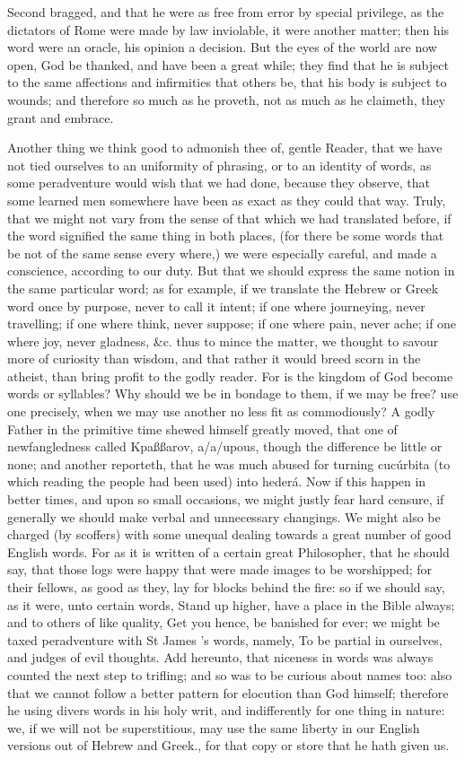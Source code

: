 Second bragged, and that he were as free from error by special privilege, as the dictators of Rome were made by law inviolable, it were another matter; then his word were an oracle, his opinion a decision. But the eyes of the world are now open, God be thanked, and have been a great while; they find that he is subject to the same affections and infirmities that others be, that his body is subject to wounds; and therefore so much as he proveth, not as much as he claimeth, they grant and embrace.

Another thing we think good to admonish thee of, gentle Reader, that we have not tied ourselves to an uniformity of phrasing, or to an identity of words, as some peradventure would wish that we had done, because they observe, that some learned men somewhere have been as exact as they could that way. Truly, that we might not vary from the sense of that which we had translated before, if the word signified the same thing in both places, (for there be some words that be not of the same sense every where,) we were especially careful, and made a conscience, according to our duty. But that we should express the same notion in the same particular word; as for example, if we translate the Hebrew or Greek word once by purpose, never to call it intent; if one where journeying, never travelling; if one where think, never suppose; if one where pain, never ache; if one where joy, never gladness, &c. thus to mince the matter, we thought to savour more of curiosity than wisdom, and that rather it would breed scorn in the atheist, than bring profit to the godly reader. For is the kingdom of God become words or syllables? Why should we be in bondage to them, if we may be free? use one precisely, when we may use another no less fit as commodiously? A godly Father in the primitive time shewed himself greatly moved, that one of newfangledness called Kpaßßarov, a/a/upous, though the difference be little or none; and another reporteth, that he was much abused for turning cucúrbita (to which reading the people had been used) into hederá. Now if this happen in better times, and upon so small occasions, we might justly fear hard censure, if generally we should make verbal and unnecessary changings. We might also be charged (by scoffers) with some unequal dealing towards a great number of good English words. For as it is written of a certain great Philosopher, that he should say, that those logs were happy that were made images to be worshipped; for their fellows, as good as they, lay for blocks behind the fire: so if we should say, as it were, unto certain words, Stand up higher, have a place in the Bible always; and to others of like quality, Get you hence, be banished for ever; we might be taxed peradventure with St James 's words, namely, To be partial in ourselves, and judges of evil thoughts. Add hereunto, that niceness in words was always counted the next step to trifling; and so was to be curious about names too: also that we cannot follow a better pattern for elocution than God himself; therefore he using divers words in his holy writ, and indifferently for one thing in nature: we, if we will not be superstitious, may use the same liberty in our English versions out of Hebrew and Greek., for that copy or store that he hath given us. 
